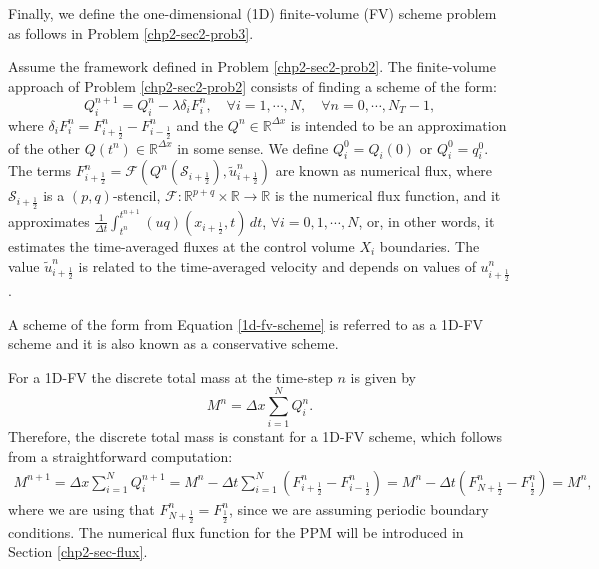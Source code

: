 Finally, we define the one-dimensional (1D) finite-volume (FV)
scheme problem as follows in Problem \ref{chp2-sec2-prob3}.
\begin{prob}[1D-FV scheme]
	\label{chp2-sec2-prob3}
	Assume the framework defined in Problem \ref{chp2-sec2-prob2}.
	The finite-volume approach of Problem \ref{chp2-sec2-prob2}
	consists of finding a scheme of the form:
        \begin{equation}
					\label{1d-fv-scheme}
		{Q}_{i}^{n+1} =  {Q}_{i}^{n} -
            \lambda \delta_i {F}_{i}^{n},
                \quad \forall i = 1, \cdots, N,
                \quad \forall n = 0, \cdots, N_T-1,
        \end{equation}
	where $\delta_i {F}_{i}^{n} = 
    {F}_{i+\frac{1}{2}}^{n} - {F}_{i-\frac{1}{2}}^{n}$
    and the ${Q}^{n} \in \mathbb{R}^{\Delta x}$ is intended to be an approximation
	of the other  ${Q}(t^{n})\in \mathbb{R}^{\Delta x}$ in some sense. We define
    ${Q}_{i}^{0} = {Q}_i(0)$ or ${Q}_{i}^{0} = {q}^{0}_{i}$. 
	The terms ${F}_{i+\frac{1}{2}}^{n} = \mathcal{F}
    (Q^{n}(\mathcal{S}_{i+\frac{1}{2}} ), \tilde{u}^n_{i+\frac{1}{2}})$ are known as numerical flux, 
    where $\mathcal{S}_{i+\frac{1}{2}}$ is a $(p,q)$-stencil, $\mathcal{F}:\mathbb{R}^{p+q}\times \mathbb{R} \to \mathbb{R}$ 
    is the numerical flux function, and it approximates
	$\frac{1}{\Delta t}\int_{t^{n}}^{t^{n+1}} 
    {(uq)}(x_{i+\frac{1}{2}}, t) \,dt $,
	$\forall i = 0, 1, \cdots, N$,
	or, in other words, it estimates the time-averaged fluxes at
    the control volume $X_i$ boundaries. The value $\tilde{u}_{i+\frac{1}{2}}^n$ is related to the time-averaged velocity
    and depends on values of $u_{i+\frac{1}{2}}^n$.
\end{prob}
\begin{remark}
	A scheme of the form from Equation \eqref{1d-fv-scheme} is referred to as a 1D-FV scheme and
	it is also known as a conservative scheme.
\end{remark}
For a 1D-FV the discrete total mass at the time-step $n$ is given by
\begin{equation}
	\label{1d-fv-mass}
	M^n =  \Delta x \sum_{i=1}^N Q_i^n.
\end{equation}
Therefore, the discrete total mass is constant for a 1D-FV scheme,
which follows from a straightforward computation:
\begin{align*}
	M^{n+1} =  \Delta x \sum_{i=1}^N Q_i^{n+1}
					= M^{n} - \Delta t  \sum_{i=1}^N (F^n_{i+\frac{1}{2}}- F^n_{i-\frac{1}{2}})
					= M^{n} - \Delta t (F^n_{N+\frac{1}{2}}- F^n_{\frac{1}{2}})
					= M^{n},
\end{align*}
where we are using that $F^n_{N+\frac{1}{2}} = F^n_{\frac{1}{2}}$, since we are assuming periodic boundary
conditions.
The numerical flux function for the PPM will be introduced in Section \ref{chp2-sec-flux}.

